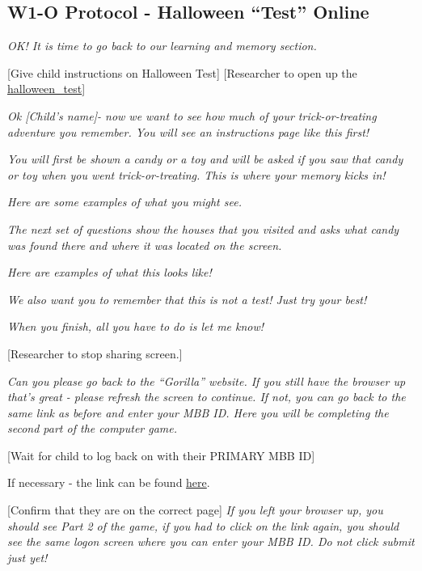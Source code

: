 \documentclass[]{book}
\begin{document}
\hypertarget{w1-o-protocol---halloween-test-online}{%
\subsection{W1-O Protocol - Halloween ``Test'' Online}\label{w1-o-protocol---halloween-test-online}}

\emph{OK! It is time to go back to our learning and memory section.}

{[}Give child instructions on Halloween Test{]} {[}Researcher to open up the \href{https://ucla.app.box.com/file/709479264913}{halloween\_test}{]}

\emph{Ok {[}Child's name{]}- now we want to see how much of your trick-or-treating adventure you remember. You will see an instructions page like this first!}

\emph{You will first be shown a candy or a toy and will be asked if you saw that candy or toy when you went trick-or-treating. This is where your memory kicks in!}

\emph{Here are some examples of what you might see.}

\emph{The next set of questions show the houses that you visited and asks what candy was found there and where it was located on the screen.}

\emph{Here are examples of what this looks like!}

\emph{We also want you to remember that this is not a test! Just try your best!}

\emph{When you finish, all you have to do is let me know!}

{[}Researcher to stop sharing screen.{]}

\emph{Can you please go back to the ``Gorilla'' website. If you still have the browser up that's great - please refresh the screen to continue. If not, you can go back to the same link as before and enter your MBB ID. Here you will be completing the second part of the computer game.}

{[}Wait for child to log back on with their PRIMARY MBB ID{]}

If necessary - the link can be found \href{https://research.sc/participant/login/20451/publicid}{here}.

{[}Confirm that they are on the correct page{]} \emph{If you left your browser up, you should see Part 2 of the game, if you had to click on the link again, you should see the same logon screen where you can enter your MBB ID. Do not click submit just yet!}
\end{document}
